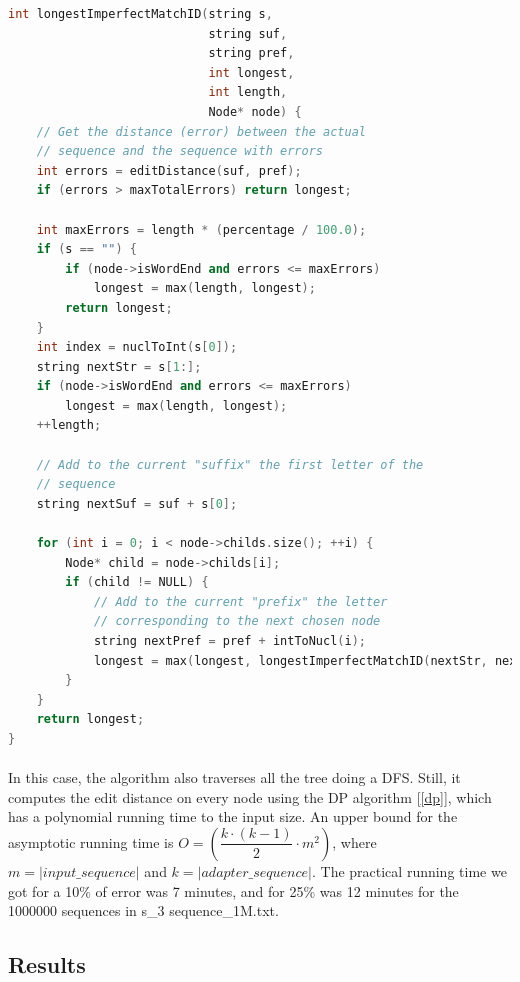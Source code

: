 \documentclass[a4paper,10pt]{article}
\begin{document}
\begin{lstlisting}[language=c++, caption=Algorithm to get the longest prefix-suffix match allowing insertions and deletions]
int longestImperfectMatchID(string s,
                            string suf,
                            string pref,
                            int longest,
                            int length,
                            Node* node) {
    // Get the distance (error) between the actual
    // sequence and the sequence with errors
    int errors = editDistance(suf, pref);
    if (errors > maxTotalErrors) return longest;
    
    int maxErrors = length * (percentage / 100.0);
    if (s == "") {
        if (node->isWordEnd and errors <= maxErrors)
            longest = max(length, longest);
        return longest;
    }
    int index = nuclToInt(s[0]);
    string nextStr = s[1:];
    if (node->isWordEnd and errors <= maxErrors) 
        longest = max(length, longest);
    ++length;

    // Add to the current "suffix" the first letter of the
    // sequence
    string nextSuf = suf + s[0];

    for (int i = 0; i < node->childs.size(); ++i) {
        Node* child = node->childs[i];
        if (child != NULL) {
            // Add to the current "prefix" the letter
            // corresponding to the next chosen node
            string nextPref = pref + intToNucl(i);
            longest = max(longest, longestImperfectMatchID(nextStr, nextSuf, nextPref, longest, length, child));
        }
    }
    return longest;
}
\end{lstlisting}

\paragraph{} In this case, the algorithm also traverses all the tree doing a DFS. Still, it computes the edit distance on every node using the DP algorithm [\ref{dp}], which has a polynomial running time to the input size. An upper bound for the asymptotic running time is $O=(\dfrac{k\cdot(k-1)}{2}\cdot m^2)$, where $m = |input\_sequence|$ and $k = |adapter\_sequence|$. The practical running time we got for a 10\% of error was 7 minutes, and for 25\% was 12 minutes for the 1000000 sequences in s\_3 sequence\_1M.txt.

\subsection{Results}
\end{document}
